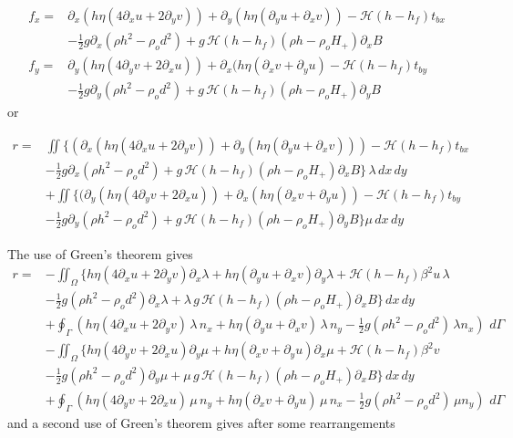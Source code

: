 \documentclass[10pt,a4paper]{book}
\newcommand{\He}{\mathcal{H}}
\newcommand{\p}{\partial}
\newcommand{\tbx}{t_{bx}}
\newcommand{\tby}{t_{by}}
\begin{document}
\begin{align} 
f_x=&\p_x ( h \eta ( 4 \p_x u + 2 \p_y v)) + \p_y ( h \eta (\p_y u + \p_x v) ) - \He(h-h_f) \tbx  \nonumber \\
&-\frac{1}{2} g \p_x (\rho h^2 - \rho_o d^2)+ g\,\He(h-h_f) (\rho h -\rho_o H_{+}) \p_x B 
\label{eq:A1x}\\
f_y=&\p_y (  h \eta ( 4 \p_y v + 2 \p_x u )) +\p_x ( h \eta (\p_x v + \p_y u ) - \He(h-h_f) \tby  \nonumber \\
&-\frac{1}{2} g \p_y (\rho h^2 - \rho_o d^2)+g\,\He(h-h_f) (\rho h -\rho_o H_{+}) \p_y B
\label{eq:A1y}
\end{align}
or

\begin{align*}
r=& \iint  \big \{ ( \p_x ( h \eta ( 4 \p_x u + 2 \p_y v)) + \p_y ( h \eta (\p_y u + \p_x v) )) - \He(h-h_f) \tbx   \nonumber \\
&-\frac{1}{2} g \p_x (\rho h^2 - \rho_o d^2)+ g\,\He(h-h_f) (\rho h -\rho_o H_{+}) \p_x B \big \} \, \lambda \, dx \, dy \nonumber \\
&+ \iint \big \{ (\p_y (  h \eta ( 4 \p_y v + 2 \p_x u )) +\p_x ( h \eta (\p_x v + \p_y u ) ) - \He(h-h_f) \tby  \nonumber \\
&-\frac{1}{2} g \p_y (\rho h^2 - \rho_o d^2)+g\,\He(h-h_f) (\rho h -\rho_o H_{+}) \p_y B \big \} \mu \, dx \, dy
\end{align*}




The use of Green's theorem gives
\begin{align} 
r=& -\iint_{\Omega} \big \{ h \eta ( 4 \p_x u + 2 \p_y v ) \p_x \lambda +  h \eta (\p_y u + \p_x v) \p_y \lambda + \He(h-h_f) \beta^2 u \, \lambda \nonumber \\
  &- \frac{1}{2} g (\rho h^2 - \rho_o d^2) \p_x \lambda   + \lambda \, g\,\He(h-h_f) (\rho h -\rho_o H_{+}) \p_x B \big \} \, dx \, dy \nonumber \\
  &+ \oint_{\Gamma} (h \eta ( 4\p_x u + 2 \p_y v) \, \lambda \, n_x+  h \eta (\p_y u + \p_x v) \, \lambda \, n_y- \frac{1}{2} g (\rho h^2 - \rho_o d^2) \, \lambda n_x)\, \, d\Gamma \nonumber \\
  &- \iint_{\Omega} \big \{ h \eta ( 4 \p_y v + 2 \p_x u ) \p_y \mu +  h \eta (\p_x v + \p_y u) \p_x \mu + \He(h-h_f) \beta^2 v \,  \nonumber \\
  &- \frac{1}{2} g (\rho h^2 - \rho_o d^2) \p_y \mu   + \mu \, g\,\He(h-h_f) (\rho h -\rho_o H_{+}) \p_x B \big \}  \, dx \, dy \nonumber \\
  &+ \oint_{\Gamma} (h \eta ( 4\p_y v + 2 \p_x u) \, \mu \, n_y+  h \eta (\p_x v + \p_y u) \, \mu \, n_x- \frac{1}{2} g (\rho h^2 - \rho_o d^2) \, \mu n_y)\, \, d\Gamma \nonumber
\end{align}
and a second use of Green's theorem gives after some rearrangements
\end{document}
